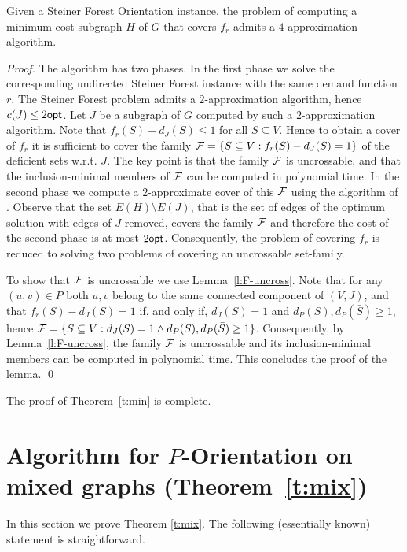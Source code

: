 \documentclass[envcountsame]{llncs}
\begin{document}
\begin{lemma} \label{l:3}
Given a {\sf Steiner Forest Orientation} instance, the problem of compu\-ting a 
minimum-cost subgraph $H$ of $G$ that covers $f_r$ admits a $4$-approximation algorithm.
\end{lemma}
\begin{proof}
The algorithm has two phases.
In the first phase we solve the corresponding undirected {\sf Steiner Forest} instance
with the same demand function $r$. The {\sf Steiner Forest} 
problem admits a $2$-approximation algorithm, hence $c(J) \leq 2 {\sf opt}$.
Let $J$ be a subgraph of $G$ computed by such a $2$-approximation algorithm.
Note that $f_r(S)-d_J(S) \leq 1$ for all $S \subseteq V$.
Hence to obtain a cover of $f_r$ it is sufficient to cover 
the family ${\cal F}=\{S \subseteq V:f_r(S)-d_J(S)=1\}$ of the deficient sets w.r.t. $J$.
The key point is that the family ${\cal F}$ is uncrossable, and that the inclusion-minimal 
members of ${\cal F}$ can be computed in polynomial time.
In the second phase we compute a $2$-approximate cover of this ${\cal F}$ using the 
algorithm of \cite{GGPS}.
Observe that the set $E(H) \setminus E(J)$, that is 
the set of edges of the optimum solution with edges of $J$ removed,
covers the family ${\cal F}$ and therefore the cost of the second phase 
is at most $2 {\sf opt}$.
Consequently, the problem of covering $f_r$ is reduced to solving two problems
of covering an uncrossable set-family.  

To show that ${\cal F}$ is uncrossable we use Lemma~\ref{l:F-uncross}.
Note that for any $(u,v) \in P$ both $u,v$ belong to the same connected component of $(V,J)$, 
and that $f_r(S)-d_J(S)=1$ if, and only if, $d_J(S)=1$ and $d_P(S),d_P(\bar{S}) \geq 1$,
hence ${\cal F}=\{S \subseteq V: d_J(S)=1 \wedge d_P(S),d_P(\bar{S}) \geq 1\}$.
Consequently, by Lemma~\ref{l:F-uncross}, the family ${\cal F}$ is uncrossable and its 
inclusion-minimal members can be computed in polynomial time.
This concludes the proof of the lemma.
\qed
\end{proof}

The proof of Theorem~\ref{t:min} is complete.

\section{Algorithm for {\sf $P$-Orientation} on mixed graphs (Theorem~\ref{t:mix})} \label{s:mix}

In this section we prove Theorem \ref{t:mix}.
The following (essentially known) statement is straightforward. 
\end{document}
